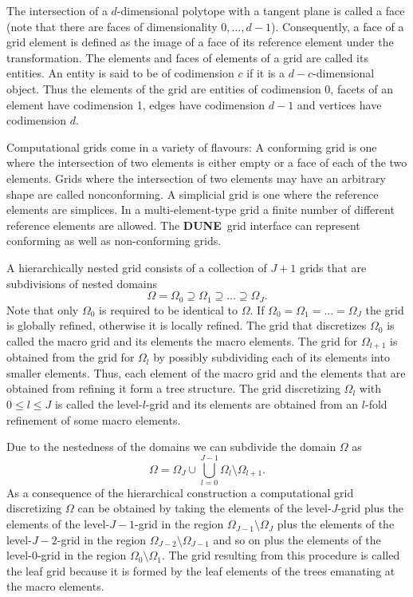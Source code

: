 \documentclass[11pt,a4paper,headinclude,footinclude,DIV14,BCOR8.25mm,titlepage,twoside,openright,normalheadings]{scrreprt}
\newcommand{\Dune}{{\sf\bfseries DUNE}}
\begin{document}
The intersection of a $d$-dimensional polytope with a
tangent plane is called a face (note that there are faces of
dimensionality $0,\ldots,d-1$). Consequently, a face of a grid element
is defined as the image of a face of its reference element under the
transformation. The elements and faces of elements of a grid are
called its entities. An entity is said to be of codimension $c$ if it
is a $d-c$-dimensional object. Thus the elements of the grid are
entities of codimension 0, facets of an element have codimension 1,
edges have codimension $d-1$ and vertices have codimension $d$.

Computational grids come in a variety of flavours: A
{conforming} grid is one where the intersection of two
elements is either empty or a face of each of the two elements. 
Grids where the intersection of two elements may have an
arbitrary shape are called {nonconforming}. A
{simplicial} grid is one where the reference elements are
simplices. In a {multi-element-type} grid a finite number of
different reference elements are allowed. The \Dune\ grid interface
can represent conforming as well as non-conforming grids.

A {hierarchically nested} grid consists of a collection of $J+1$
grids that are subdivisions of nested domains $$\Omega=\Omega_0 \supseteq \Omega_1 \supseteq
\ldots \supseteq \Omega_J.$$ Note that only $\Omega_0$ is required to
be identical to $\Omega$. If $\Omega_0=\Omega_1=\ldots=\Omega_J$ the
grid is {globally refined}, otherwise it is {locally refined}.
The grid that discretizes $\Omega_0$ is called the macro grid and its
elements the macro elements. The
grid for $\Omega_{l+1}$ is obtained from the grid
for $\Omega_l$ by possibly subdividing each of its elements into
smaller elements. Thus, each element of the macro grid and the
elements that are obtained from refining it form a tree structure. The
grid discretizing $\Omega_l$ with $0\leq l \leq J$ is called the level-$l$-grid and its
elements are obtained from an $l$-fold refinement of some macro elements.

Due to the nestedness of the domains we can subdivide the domain
$\Omega$ as $$\Omega = \Omega_J \cup \bigcup_{l=0}^{J-1}
\Omega_l\setminus\Omega_{l+1}.$$ As a consequence of the hierarchical
construction a computational grid discretizing $\Omega$ can be
obtained by taking the elements of the level-$J$-grid plus
the elements of the level-$J-1$-grid in the region
$\Omega_{J-1}\setminus\Omega_{J}$ plus the elements of the level-$J-2$-grid in the region
$\Omega_{J-2}\setminus\Omega_{J-1}$ and so on plus the elements of the level-$0$-grid in the region
$\Omega_{0}\setminus\Omega_{1}$. The grid resulting from this
procedure is called the leaf grid
because it is formed by the leaf elements of the trees emanating at
the macro elements. 
\end{document}
